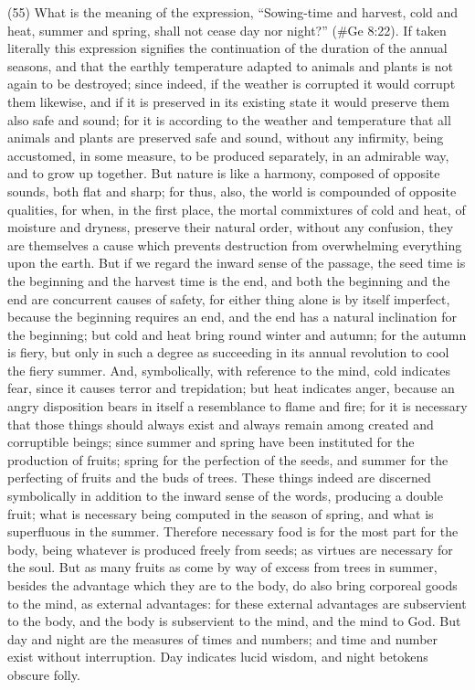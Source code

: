 (55) What is the meaning of the expression, ``Sowing-time and harvest, cold and heat, summer and
spring, shall not cease day nor night?'' (\#Ge 8:22). If taken literally this expression signifies the
continuation of the duration of the annual seasons, and that the earthly temperature adapted to
animals and plants is not again to be destroyed; since indeed, if the weather is corrupted it would
corrupt them likewise, and if it is preserved in its existing state it would preserve them also safe
and sound; for it is according to the weather and temperature that all animals and plants are
preserved safe and sound, without any infirmity, being accustomed, in some measure, to be
produced separately, in an admirable way, and to grow up together. But nature is like a harmony,
composed of opposite sounds, both flat and sharp; for thus, also, the world is compounded of
opposite qualities, for when, in the first place, the mortal commixtures of cold and heat, of moisture
and dryness, preserve their natural order, without any confusion, they are themselves a cause
which prevents destruction from overwhelming everything upon the earth. But if we regard the
inward sense of the passage, the seed time is the beginning and the harvest time is the end, and
both the beginning and the end are concurrent causes of safety, for either thing alone is by itself
imperfect, because the beginning requires an end, and the end has a natural inclination for the
beginning; but cold and heat bring round winter and autumn; for the autumn is fiery, but only in such
a degree as succeeding in its annual revolution to cool the fiery summer. And, symbolically, with
reference to the mind, cold indicates fear, since it causes terror and trepidation; but heat indicates
anger, because an angry disposition bears in itself a resemblance to flame and fire; for it is
necessary that those things should always exist and always remain among created and corruptible
beings; since summer and spring have been instituted for the production of fruits; spring for the
perfection of the seeds, and summer for the perfecting of fruits and the buds of trees. These
things indeed are discerned symbolically in addition to the inward sense of the words, producing a
double fruit; what is necessary being computed in the season of spring, and what is superfluous in
the summer. Therefore necessary food is for the most part for the body, being whatever is
produced freely from seeds; as virtues are necessary for the soul. But as many fruits as come by
way of excess from trees in summer, besides the advantage which they are to the body, do also
bring corporeal goods to the mind, as external advantages: for these external advantages are
subservient to the body, and the body is subservient to the mind, and the mind to God. But day and
night are the measures of times and numbers; and time and number exist without interruption. Day
indicates lucid wisdom, and night betokens obscure folly.

